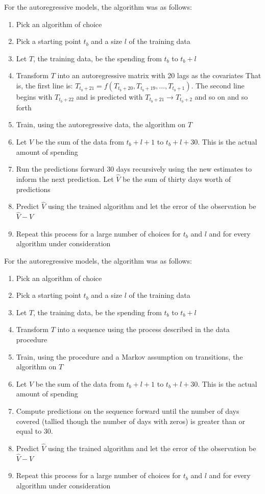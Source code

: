 \documentclass[11pt,a4paper]{article}
\begin{document}
For the autoregressive models, the algorithm was as follows:
\begin{enumerate}
	\item Pick an algorithm of choice
	\item Pick a starting point $ t_b $ and a size $ l $ of the training data
	\item Let $ T $, the training data, be the spending from $ t_b $ to $ t_b + l $
	\item Transform $ T $ into an autoregressive matrix with 20 lags as the covariates That is, the first line is: $ T_{t_b + 21} = f(T_{t_b + 20}, T_{t_b + 19}, \ldots , T_{t_b + 1}) $. The second line begins with $ T_{t_b + 22} $ and is predicted with $ T_{t_b + 21} \rightarrow T_{t_b + 2} $ and so on and so forth
	\item Train, using the autoregressive data, the algorithm on $ T $
	\item Let $ V $ be the sum of the data from $ t_b + l + 1 $ to $ t_b + l + 30 $. This is the actual amount of spending
	\item Run the predictions forward 30 days recursively using the new estimates to inform the next prediction. Let $ \hat{V} $ be the sum of thirty days worth of predictions
	\item Predict $ \hat{V} $ using the trained algorithm and let the error of the observation be $ \hat{V} - V $
	\item Repeat this process for a large number of choices for $ t_b $ and $ l $ and for every algorithm under consideration
\end{enumerate}

For the autoregressive models, the algorithm was as follows:
\begin{enumerate}
	\item Pick an algorithm of choice
	\item Pick a starting point $ t_b $ and a size $ l $ of the training data
	\item Let $ T $, the training data, be the spending from $ t_b $ to $ t_b + l $
	\item Transform $ T $ into a \yinyang sequence using the process described in the \yinyang data procedure
	\item Train, using the \yinyang procedure and a Markov assumption on transitions, the algorithm on $ T $
	\item Let $ V $ be the sum of the data from $ t_b + l + 1 $ to $ t_b + l + 30 $. This is the actual amount of spending
	\item Compute predictions on the \yinyang sequence forward until the number of days covered (tallied though the number of days with zeros) is greater than or equal to 30.
	\item Predict $ \hat{V} $ using the trained algorithm and let the error of the observation be $ \hat{V} - V $
	\item Repeat this process for a large number of choices for $ t_b $ and $ l $ and for every algorithm under consideration
\end{enumerate}
\end{document}
